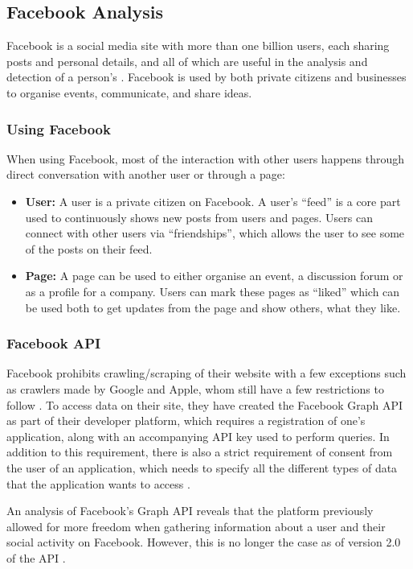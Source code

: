 \subsection{Facebook Analysis}\label{sec:facebook-analysis}
Facebook is a social media site with more than one billion users, each sharing
posts and personal details, and all of which are useful in the analysis and
detection of a person's \fbp. Facebook is used by both private citizens and
businesses to organise events, communicate, and share ideas.

\subsubsection{Using Facebook}
When using Facebook, most of the interaction with other users happens through
direct conversation with another user or through a page:

\begin{itemize}
  \item \textbf{User:} A user is a private citizen on Facebook. A user's
  ``feed'' is a core part used to continuously shows new posts from users and
  pages. Users can connect with other users via ``friendships'', which allows
  the user to see some of the posts on their feed.
  \item \textbf{Page:} A page can be used to either organise an event, a
  discussion forum or as a profile for a company. Users can mark these pages as
  ``liked'' which can be used both to get updates from the page and show
  others, what they like.
\end{itemize}


\subsubsection{Facebook API}
Facebook prohibits crawling/scraping of their website with a few exceptions such
as crawlers made by Google and Apple, whom still have a few restrictions to
follow \citep{FacebookRobotsTxt}. To access data on their site, they have
created the Facebook Graph \ac{API} as part of their developer platform, which
requires a registration of one's application, along with an accompanying
\ac{API} key used to perform queries. In addition to this requirement, there is
also a strict requirement of consent from the user of an application, which
needs to specify all the different types of data that the application wants to
access \citep{FacebookGraphApiAccessTokens, facebookPolicy}.\nl

An analysis of Facebook's Graph \ac{API} \citep{FacebookGraphApiDocumentation}
reveals that the platform previously allowed for more freedom when gathering
information about a user and their social activity on Facebook. However, this is
no longer the case as of version 2.0 of the \ac{API}
\citep{FacebookChangesInGraphTwoPointOh}.\nl

